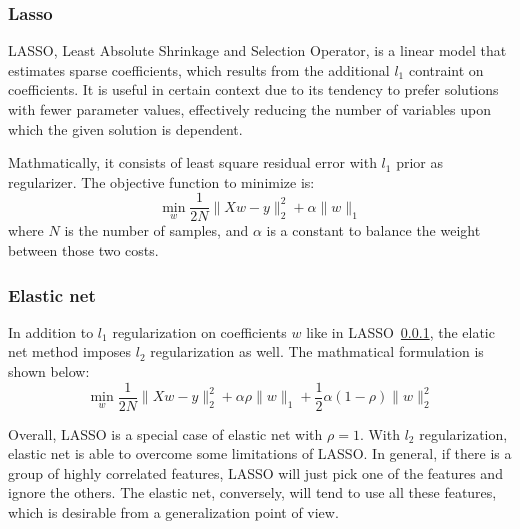\subsubsection{Lasso}
\label{ssub:lasso}
LASSO, Least Absolute Shrinkage and Selection Operator, is a linear model that estimates sparse coefficients, which results from the additional $l_1$ contraint on coefficients.
It is useful in certain context due to its tendency to prefer solutions with fewer parameter values, effectively reducing the number of variables upon which the given solution is dependent.

Mathmatically, it consists of least square residual error with $l_1$ prior as regularizer.
The objective function to minimize is:
\begin{equation}
  \min_w\frac{1}{2N}\|Xw - y\|^2_2 + \alpha\|w\|_1
\end{equation}
where $N$ is the number of samples, and $\alpha$ is a constant to balance the weight between those two costs.

\subsubsection{Elastic net}
\label{ssub:elastic_net}
In addition to $l_1$ regularization on coefficients $w$ like in LASSO~\ref{ssub:lasso}, the elatic net method imposes $l_2$ regularization as well.
The mathmatical formulation is shown below:
\begin{equation}
  \min_w\frac{1}{2N}\|Xw - y\|^2_2 + \alpha\rho\|w\|_1 + \frac{1}{2}\alpha(1-\rho)\|w\|^2_2
\end{equation}

Overall, LASSO is a special case of elastic net with $\rho = 1$.
With $l_2$ regularization, elastic net is able to overcome some limitations of LASSO\@.
In general, if there is a group of highly correlated features, LASSO will just pick one of the features and ignore the others.
The elastic net, conversely, will tend to use all these features, which is desirable from a generalization point of view.

